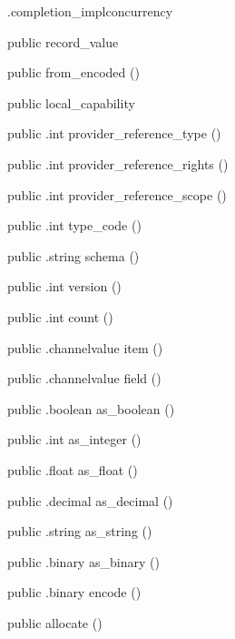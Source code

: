 \begin{CrexxClass}{.completion\_impl}{concurrency}
\begin{Members}
    \Factory
      {public}
      {record\_value}
      {}

    \Factory
      {public}
      {from\_encoded}
      {()}

    \Factory
      {public}
      {local\_capability}
      {}

    \Method
      {public}
      {.int}
      {provider\_reference\_type}
      {()}

    \Method
      {public}
      {.int}
      {provider\_reference\_rights}
      {()}

    \Method
      {public}
      {.int}
      {provider\_reference\_scope}
      {()}

    \Method
      {public}
      {.int}
      {type\_code}
      {()}

    \Method
      {public}
      {.string}
      {schema}
      {()}

    \Method
      {public}
      {.int}
      {version}
      {()}

    \Method
      {public}
      {.int}
      {count}
      {()}

    \Method
      {public}
      {.channelvalue}
      {item}
      {()}

    \Method
      {public}
      {.channelvalue}
      {field}
      {()}

    \Method
      {public}
      {.boolean}
      {as\_boolean}
      {()}

    \Method
      {public}
      {.int}
      {as\_integer}
      {()}

    \Method
      {public}
      {.float}
      {as\_float}
      {()}

    \Method
      {public}
      {.decimal}
      {as\_decimal}
      {()}

    \Method
      {public}
      {.string}
      {as\_string}
      {()}

    \Method
      {public}
      {.binary}
      {as\_binary}
      {()}

    \Method
      {public}
      {.binary}
      {encode}
      {()}

    \Factory
      {public}
      {allocate}
      {()}


\end{Members}
\end{CrexxClass}
